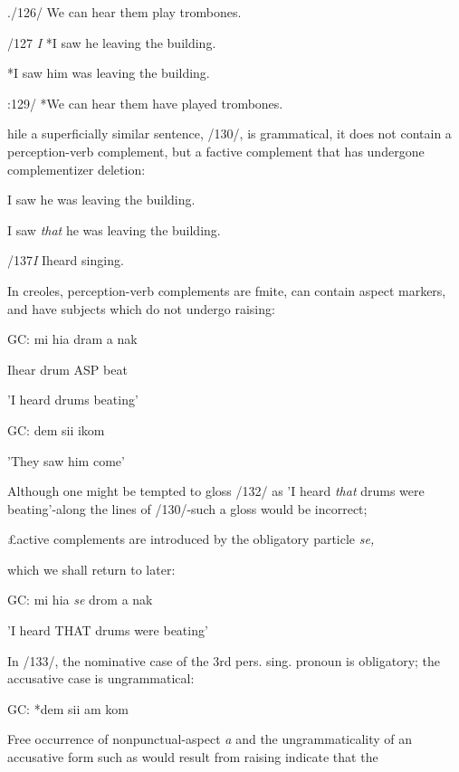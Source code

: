 ./126/ We can hear them play trombones.

/127 \textit{I} *I saw he leaving the building.

\ea\label{ex:128}
 *I saw him was leaving the building.
\glt
\z

:129/ *We can hear them have played trombones.

hile a superficially similar sentence, /130/, is grammatical, it does not contain a perception-verb complement, but a factive complement that has undergone complementizer deletion:

  


 


\ea\label{ex:130}
 I saw he was leaving the building.
\glt
\z

\ea\label{ex:131}
 I saw \textit{that} he was leaving the building.
\glt
\z

/137\textit{I} Iheard singing.


In creoles, perception-verb complements are fmite, can contain aspect markers, and have subjects which do not undergo raising:

\ea\label{ex:132}
 GC: mi hia dram a nak
\glt
\z

Ihear drum ASP beat

'I heard drums beating'

\ea\label{ex:133}
 GC: dem sii ikom
\glt
\z

'They saw him come'

Although one might be tempted to gloss /132/ as 'I heard \textit{that} drums were beating'{}-along the lines of /130/{}-such a gloss would be incorrect;

£active complements are introduced by the obligatory particle \textit{se,}

which we shall return to later:

\ea\label{ex:134}
 GC: mi hia \textit{se} drom a nak
\glt
\z

'I heard THAT drums were beating'

In /133/, the nominative case of the 3rd pers. sing. pronoun is obliga\-tory; the accusative case is ungrammatical:

\ea\label{ex:135}
 GC: *dem sii am kom
\glt
\z

Free occurrence of nonpunctual-aspect \textit{a} and the ungrammaticality of an accusative form such as would result from raising indicate that the

